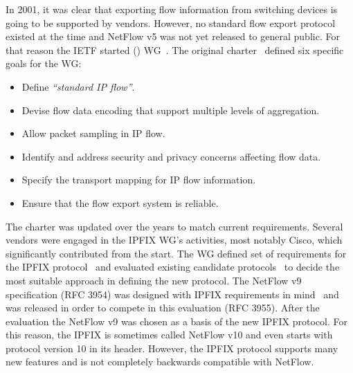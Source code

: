 In 2001, it was clear that exporting flow information from switching devices is going to be supported by vendors. However, no standard flow export protocol existed at the time and NetFlow v5 was not yet released to general public. For that reason the IETF started  () WG~\cite{IETF--IP}. The original charter~\cite{IESG-2001-IP} defined six specific goals for the WG: 

\begin{itemize}
	\item Define \emph{``standard IP flow''}.
	\item Devise flow data encoding that support multiple levels of aggregation.
	\item Allow packet sampling in IP flow.
	\item Identify and address security and privacy concerns affecting flow data.
	\item Specify the transport mapping for IP flow information.
	\item Ensure that the flow export system is reliable.
\end{itemize}

The charter was updated over the years to match current requirements. Several vendors were engaged in the IPFIX WG’s activities, most notably Cisco, which significantly contributed from the start. The WG defined set of requirements for the IPFIX protocol~\cite{rfc3917} and evaluated existing candidate protocols~\cite{rfc3955} to decide the most suitable approach in defining the new protocol. The NetFlow v9 specification (RFC 3954) was designed with IPFIX requirements in mind~\cite{Trammell-2011-Introduction} and was released in order to compete in this evaluation (RFC 3955). After the evaluation the NetFlow v9 was chosen as a basis of the new IPFIX protocol. For this reason, the IPFIX is sometimes called NetFlow v10 and even starts with protocol version 10 in its header. However, the IPFIX protocol supports many new features and is not completely backwards compatible with NetFlow.

